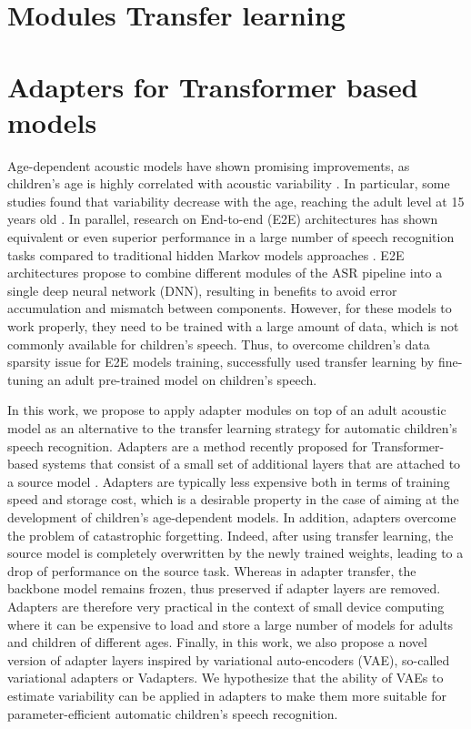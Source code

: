 \section{Modules Transfer learning}

\section{Adapters for Transformer based models}

Age-dependent acoustic models have shown promising improvements, as children's age is highly correlated with acoustic variability \cite{children_language_model2, reviewASRchildren}. In particular, some studies found that variability decrease with the age, reaching the adult level at 15 years old \cite{Acoustic_change_children}.
In parallel, research on End-to-end (E2E) architectures has shown equivalent or even superior performance in a large number of speech recognition tasks compared to traditional hidden Markov models approaches \cite{hmm-end2end}. E2E architectures propose to combine different modules of the ASR pipeline into a single deep neural network (DNN), resulting in benefits to avoid error accumulation and mismatch between components.
However, for these models to work properly, they need to be trained with a large amount of data, which is not commonly available for children's speech. Thus, to overcome children's data sparsity issue for E2E models training, \cite{sri_end2end,gelin2021endtoend} successfully used transfer learning by fine-tuning an adult pre-trained model on children's speech.

In this work, we propose to apply adapter modules on top of an adult acoustic model as an alternative to the transfer learning strategy for automatic children's speech recognition. Adapters are a method recently proposed for Transformer-based systems that consist of a small set of additional layers that are attached to a source model \cite{houlsby,pfeiffer}. Adapters are typically less expensive both in terms of training speed and storage cost, which is a desirable property in the case of aiming at the development of children's age-dependent models.  In addition, adapters overcome the problem of catastrophic forgetting. Indeed, after using transfer learning, the source model is completely overwritten by the newly trained weights, leading to a drop of performance on the source task. Whereas in adapter transfer, the backbone model remains frozen, thus preserved if adapter layers are removed. Adapters are therefore very practical in the context of small device computing where it can be expensive to load and store a large number of models for adults and children of different ages. Finally, in this work, we also propose a novel version of adapter layers inspired by variational auto-encoders (VAE)\cite{VAE}, so-called variational adapters or Vadapters. We hypothesize that the ability of VAEs to estimate variability can be applied in adapters to make them more suitable for parameter-efficient automatic children's speech recognition.




